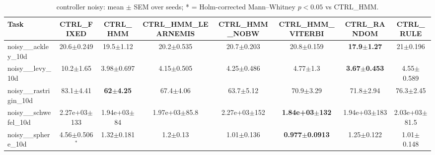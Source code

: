 \begin{table}[t]
\caption{controller noisy: mean $\pm$ SEM over seeds; * = Holm-corrected Mann--Whitney $p<0.05$ vs CTRL_HMM.}
\label{tab:controller_noisy}
\begin{center}\small
\begin{tabular}{lccccccc}
\hline
Task & CTRL\_FIXED & CTRL\_HMM & CTRL\_HMM\_LEARNEMIS & CTRL\_HMM\_NOBW & CTRL\_HMM\_VITERBI & CTRL\_RANDOM & CTRL\_RULE \\
\hline
noisy\_\_ackley\_10d & 20.6$\pm$0.249 & 19.5$\pm$1.12 & 20.2$\pm$0.535 & 20.7$\pm$0.203 & 20.8$\pm$0.159 & \textbf{17.9$\pm$1.27} & 21$\pm$0.196 \\
noisy\_\_levy\_10d & 10.2$\pm$1.65 & 3.98$\pm$0.697 & 4.15$\pm$0.505 & 4.25$\pm$0.486 & 4.77$\pm$1.3 & \textbf{3.67$\pm$0.453} & 4.55$\pm$0.589 \\
noisy\_\_rastrigin\_10d & 83.1$\pm$4.41 & \textbf{62$\pm$4.25} & 67.4$\pm$4.06 & 63.7$\pm$5.12 & 70.9$\pm$3.29 & 71.8$\pm$2.94 & 76.3$\pm$2.45 \\
noisy\_\_schwefel\_10d & 2.27e+03$\pm$133 & 1.94e+03$\pm$84 & 1.97e+03$\pm$85.8 & 2.27e+03$\pm$152 & \textbf{1.84e+03$\pm$132} & 1.94e+03$\pm$183 & 2.03e+03$\pm$81.5 \\
noisy\_\_sphere\_10d & 4.56$\pm$0.506$^{*}$ & 1.32$\pm$0.181 & 1.2$\pm$0.13 & 1.01$\pm$0.136 & \textbf{0.977$\pm$0.0913} & 1.25$\pm$0.122 & 1.01$\pm$0.148 \\
\hline
\end{tabular}
\end{center}
\end{table}